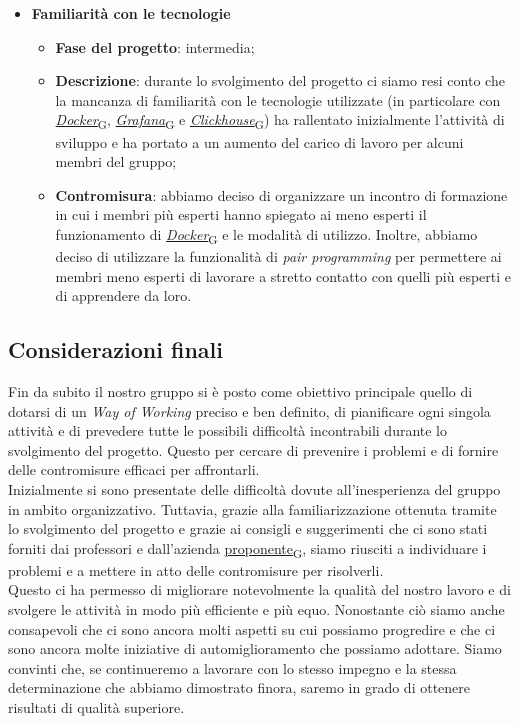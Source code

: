 \begin{itemize}
\begin{itemize}
    \end{itemize}
    \item \textbf{Familiarità con le tecnologie}
    \begin{itemize}
        \item \textbf{Fase del progetto}: intermedia;
        \item \textbf{Descrizione}: durante lo svolgimento del progetto ci siamo resi conto che la mancanza di familiarità con le tecnologie utilizzate (in particolare con \href{https://7last.github.io/docs/rtb/documentazione-interna/glossario\#docker}{\textit{Docker}\textsubscript{G}}, \href{https://7last.github.io/docs/rtb/documentazione-interna/glossario\#grafana}{\textit{Grafana}\textsubscript{G}} e \href{https://7last.github.io/docs/rtb/documentazione-interna/glossario\#clickhouse}{\textit{Clickhouse}\textsubscript{G}}) ha rallentato inizialmente l'attività di sviluppo e ha portato a un aumento del carico di lavoro per alcuni membri del gruppo;
        \item \textbf{Contromisura}: abbiamo deciso di organizzare un incontro di formazione in cui i membri più esperti hanno spiegato ai meno esperti il funzionamento di \href{https://7last.github.io/docs/rtb/documentazione-interna/glossario\#docker}{\textit{Docker}\textsubscript{G}} e le modalità di utilizzo. Inoltre, abbiamo deciso di utilizzare la funzionalità di \textit{pair programming} per permettere ai membri meno esperti di lavorare a stretto contatto con quelli più esperti e di apprendere da loro. 
    \end{itemize}
\end{itemize}

\subsection{Considerazioni finali}
Fin da subito il nostro gruppo si è posto come obiettivo principale quello di dotarsi di un \textit{Way of Working} preciso e ben definito, di pianificare ogni singola attività e di prevedere tutte le possibili difficoltà incontrabili durante lo svolgimento del progetto. Questo per cercare di prevenire i problemi e di fornire delle contromisure efficaci per affrontarli. \\
Inizialmente si sono presentate delle difficoltà dovute all'inesperienza del gruppo in ambito organizzativo. Tuttavia, grazie alla familiarizzazione ottenuta tramite lo svolgimento del progetto e grazie ai consigli e suggerimenti che ci sono stati forniti dai professori e dall'azienda \href{https://7last.github.io/docs/rtb/documentazione-interna/glossario\#proponente}{proponente\textsubscript{G}}, siamo riusciti a individuare i problemi e a mettere in atto delle contromisure per risolverli. \\
Questo ci ha permesso di migliorare notevolmente la qualità del nostro lavoro e di svolgere le attività in modo più efficiente e più equo. Nonostante ciò siamo anche consapevoli che ci sono ancora molti aspetti su cui possiamo progredire e che ci sono ancora molte iniziative di automiglioramento che possiamo adottare. Siamo convinti che, se continueremo a lavorare con lo stesso impegno e la stessa determinazione che abbiamo dimostrato finora, saremo in grado di ottenere risultati di qualità superiore.
